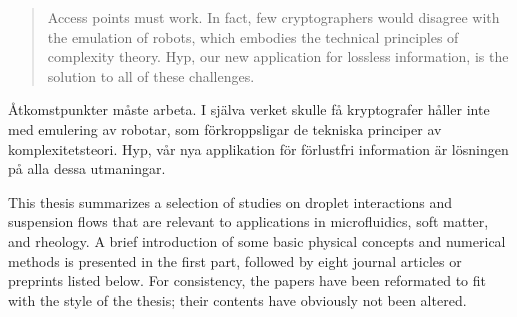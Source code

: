 %
\makecoverpage


%
\dedication{
	{\it If the scientist had an infinity of time at his disposal, it would be sufficient to say to him, ``Look, and look carefully.''}\\[20pt]
	Henri Poincar\'e
}


%
%
\begin{abstract}
	Access points  must work. In fact, few cryptographers would disagree with
	the emulation of robots, which embodies the technical principles of
	complexity theory. Hyp, our new application for lossless information, is the
	solution to all of these challenges.
\end{abstract}


%
%
\begin{abstrakt}
	\r{A}tkomstpunkter m\r{a}ste arbeta. I sj\"{a}lva verket skulle f\r{a}
	kryptografer h\r{a}ller inte med emulering av robotar, som
	f\"{o}rkroppsligar de tekniska principer av komplexitetsteori. Hyp, v\r{a}r
	nya applikation f\"{o}r f\"{o}rlustfri information är l\"{o}sningen på alla
	dessa utmaningar.
\end{abstrakt}


%
\begin{preface}
	This thesis summarizes a selection of studies on droplet interactions and suspension flows
        that are relevant to applications in microfluidics, soft matter, and rheology.
        A brief introduction of some basic physical concepts and numerical methods is presented in the first part,
        followed by eight journal articles or preprints listed below. 
        For consistency, the papers have been reformated to fit with the style of the thesis;
        their contents have obviously not been altered.
\end{preface}


